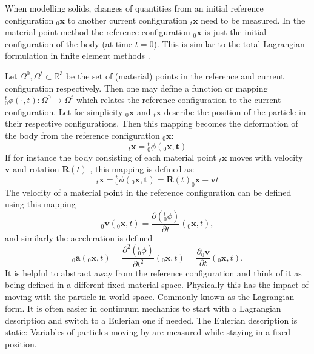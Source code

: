 \documentclass[m,times]{cgMA}
\begin{document}
When modelling solids, changes of quantities from an initial reference configuration $_0\boldsymbol{x}$ to another current configuration $_t\boldsymbol{x}$ need to be measured. In the material point method the reference configuration $_0\boldsymbol{x}$ is just the initial configuration of the body (at time $t=0$). This is similar to the total Lagrangian formulation in finite element methods \cite{bathe2006finite}.

Let $\Omega ^ { 0 } , \Omega ^ { t } \subset \mathbb { R } ^ {  { 3 } }$ be the set of (material) points in the reference and current configuration respectively.  Then one may define a function or mapping ${^t_0}\phi ( \cdot , t ) : \Omega ^ { 0 } \rightarrow \Omega ^ { t }$ which relates the reference configuration to the current configuration. Let for simplicity $_0\boldsymbol{x}$ and $_t\boldsymbol{{x}}$ describe the position of the particle in their respective configurations. Then this mapping becomes the deformation of the body from the reference configuration $_0\boldsymbol{x}$:
\begin{equation}
  _t\boldsymbol{x} =  {^t_0}\phi ( _0\boldsymbol{x} , \boldsymbol { t } )
\end{equation}
If for instance the body consisting of each material point $_t\boldsymbol{x}$ moves with velocity $\boldsymbol{v}$ and rotation $\boldsymbol{R}(t)$ , this mapping is defined as:
\begin{equation}\label{eq:rigid}
  _t\boldsymbol{{x}} = {^t_0}\phi ( _0\boldsymbol{x} , \boldsymbol { t } ) = \boldsymbol{R}(t)_0\boldsymbol{x}+\boldsymbol{v}t
\end{equation}
The velocity of a material point in the reference configuration can be defined using this mapping
\begin{equation}\label{eq:velocity}
  _0\boldsymbol{v}(_0\boldsymbol{x},t) = \frac{\partial ({^t_0}\phi)}{\partial t}(_0\boldsymbol{x},t),
\end{equation}
and similarly the acceleration is defined
\begin{equation}
  _0\boldsymbol{a}(_0\boldsymbol{x},t) = \frac{\partial^2 ({^t_0}\phi)}{\partial t^2}(_0\boldsymbol{x},t) = \frac{\partial _0\boldsymbol{v}}{\partial t}(_0\boldsymbol{x},t).
\end{equation}
It is helpful to abstract away from the reference configuration and think of it as being defined in a different fixed material space. Physically this has the impact of moving with the particle in world space. Commonly known as the Lagrangian form. It is often easier in continuum mechanics to start with a Lagrangian description and switch to a Eulerian one if needed. The Eulerian description is static: Variables of particles moving by are measured while staying in a fixed position.
\end{document}
